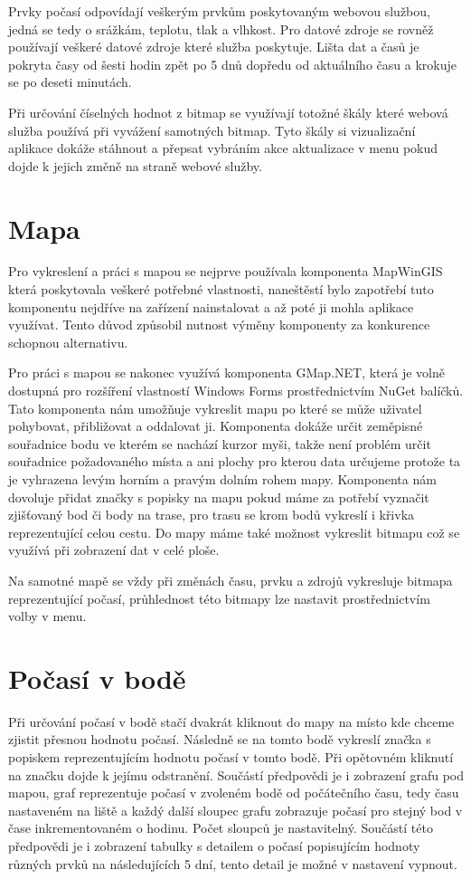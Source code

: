 \documentclass[czech,bachelor,dept460,male,csharp,cpdeclaration]{diploma}
\begin{document}
	Prvky počasí odpovídají veškerým prvkům poskytovaným webovou službou, jedná se tedy o srážkám, teplotu, tlak a vlhkost. Pro datové zdroje se rovněž používají veškeré datové zdroje které služba poskytuje. Lišta dat a časů 
	je pokryta časy od šesti hodin zpět po 5 dnů dopředu od aktuálního času a krokuje se po deseti minutách.
	
	Při určování číselných hodnot z bitmap se využívají totožné škály které webová služba používá při vyvážení samotných bitmap. Tyto škály si vizualizační aplikace dokáže stáhnout a přepsat vybráním akce aktualizace v menu pokud dojde k jejich změně na straně webové služby.
	
	\section{Mapa}
	
	Pro vykreslení a práci s mapou se nejprve používala komponenta MapWinGIS která poskytovala veškeré potřebné vlastnosti, naneštěstí bylo zapotřebí tuto komponentu nejdříve na zařízení nainstalovat a až poté ji mohla aplikace využívat. Tento důvod způsobil nutnost výměny komponenty za konkurence schopnou alternativu.
	
	Pro práci s mapou se nakonec využívá komponenta GMap.NET, která je volně dostupná pro rozšíření vlastností Windows Forms prostřednictvím NuGet balíčků. Tato komponenta nám umožňuje vykreslit mapu po které se může uživatel pohybovat, přibližovat a oddalovat ji. Komponenta dokáže určit zeměpisné souřadnice bodu ve kterém se nachází kurzor myši, takže není problém určit souřadnice požadovaného místa a ani plochy pro kterou data určujeme protože ta je vyhrazena levým horním a pravým dolním rohem mapy. Komponenta nám dovoluje přidat značky s popisky na mapu pokud máme za potřebí vyznačit zjišťovaný bod či body na trase, pro trasu se krom bodů vykreslí i křivka reprezentující celou cestu. Do mapy máme také možnost vykreslit bitmapu což se využívá při zobrazení dat v celé ploše.
	
	Na samotné mapě se vždy při změnách času, prvku a zdrojů vykresluje bitmapa reprezentující počasí, průhlednost této bitmapy lze nastavit prostřednictvím volby v menu.
	
	\section{Počasí v bodě}
	
	Při určování počasí v bodě stačí dvakrát kliknout do mapy na místo kde chceme zjistit přesnou hodnotu počasí. Následně se na tomto bodě vykreslí značka s popiskem reprezentujícím hodnotu počasí v tomto bodě. Při opětovném kliknutí na značku dojde k jejímu odstranění. Součástí předpovědi je i zobrazení grafu pod mapou, graf reprezentuje počasí v zvoleném bodě od počátečního času, tedy času nastaveném na liště a každý další sloupec grafu zobrazuje počasí pro stejný bod v čase inkrementovaném o hodinu. Počet sloupců je nastavitelný. Součástí této předpovědi je i zobrazení tabulky s detailem o počasí popisujícím hodnoty různých prvků na následujících 5 dní, tento detail je možné v nastavení vypnout.
	
\end{document}

